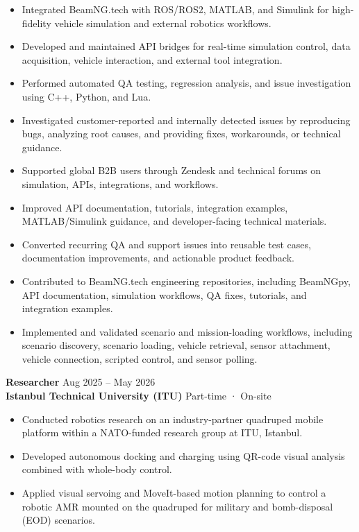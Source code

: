 \documentclass[11pt,a4paper]{article}
\begin{document}
\begin{itemize}
    \item Integrated BeamNG.tech with ROS/ROS2, MATLAB, and Simulink for high-fidelity vehicle simulation and external robotics workflows.
    \item Developed and maintained API bridges for real-time simulation control, data acquisition, vehicle interaction, and external tool integration.
    \item Performed automated QA testing, regression analysis, and issue investigation using C++, Python, and Lua.
    \item Investigated customer-reported and internally detected issues by reproducing bugs, analyzing root causes, and providing fixes, workarounds, or technical guidance.
    \item Supported global B2B users through Zendesk and technical forums on simulation, APIs, integrations, and workflows.
    \item Improved API documentation, tutorials, integration examples, MATLAB/Simulink guidance, and developer-facing technical materials.
    \item Converted recurring QA and support issues into reusable test cases, documentation improvements, and actionable product feedback.
    \item Contributed to BeamNG.tech engineering repositories, including BeamNGpy, API documentation, simulation workflows, QA fixes, tutorials, and integration examples.
    \item Implemented and validated scenario and mission-loading workflows, including scenario discovery, scenario loading, vehicle retrieval, sensor attachment, vehicle connection, scripted control, and sensor polling.
\end{itemize}

\textbf{\color{PrimaryColor}Researcher} \hfill Aug 2025 -- May 2026\\
\textbf{Istanbul Technical University (ITU)} \hfill Part-time · On-site

\begin{itemize}
    \item Conducted robotics research on an industry-partner quadruped mobile platform within a NATO-funded research group at ITU, Istanbul.
    \item Developed autonomous docking and charging using QR-code visual analysis combined with whole-body control.
    \item Applied visual servoing and MoveIt-based motion planning to control a robotic AMR mounted on the quadruped for military and bomb-disposal (EOD) scenarios.
\end{itemize}
\end{document}
